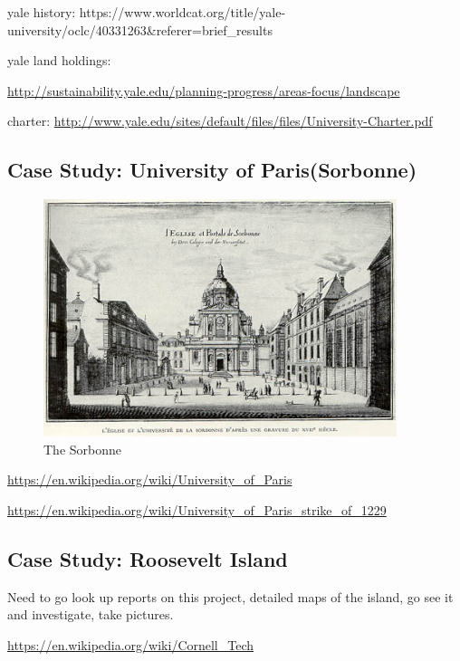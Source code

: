 yale history:
https://www.worldcat.org/title/yale-university/oclc/40331263\&referer=brief\_results

yale land holdings:

\url{http://sustainability.yale.edu/planning-progress/areas-focus/landscape}

charter:
\url{http://www.yale.edu/sites/default/files/files/University-Charter.pdf}

\subsection{Case Study: University of
Paris(Sorbonne)}\label{case-study-university-of-parissorbonne}

\begin{figure}[htbp]
\centering
\includegraphics{images/Sorbonne.png}
\caption{The Sorbonne}
\end{figure}

\url{https://en.wikipedia.org/wiki/University_of_Paris}

\url{https://en.wikipedia.org/wiki/University_of_Paris_strike_of_1229}

\subsection{Case Study: Roosevelt
Island}\label{case-study-roosevelt-island}

Need to go look up reports on this project, detailed maps of the island,
go see it and investigate, take pictures.

\url{https://en.wikipedia.org/wiki/Cornell_Tech}

